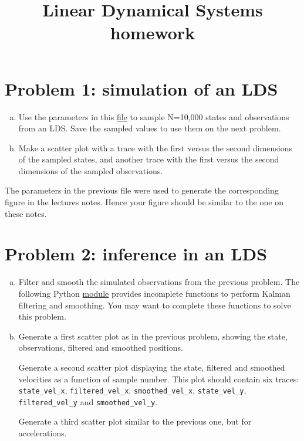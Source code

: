 \documentclass{article}
\title{Linear Dynamical Systems homework}
\author{}
\date{}
\begin{document}
\maketitle

\section*{Problem 1: simulation of an LDS}

\begin{enumerate}[(a)]

    \item Use the parameters in this
        \href{https://github.com/joacorapela/probabilisticModelingCourse/blob/master/lds/data/00000002_simulation_params.npz}{file}
        to sample N=10,000 states and observations from an LDS. Save the
        sampled values to use them on the next problem.

    \item Make a scatter plot with a trace with the first versus the second
        dimensions of the sampled states, and another trace with the first
        versus the second dimensions of the sampled observations.

\end{enumerate}

The parameters in the previous file were used to generate the corresponding
figure in the lectures notes. Hence your figure should be similar to the one on
these notes.

\section*{Problem 2: inference in an LDS}

\begin{enumerate}[(a)]

    \item Filter and smooth the simulated observations from the previous
        problem. The following Python
        \href{https://github.com/joacorapela/probabilisticModelingCourse/blob/master/lds/code/src/inference.py}{module}
        provides incomplete functions to perform Kalman filtering and
        smoothing. You may want to complete these functions to solve this
        problem.

    \item Generate a first scatter plot as in the previous problem, showing the
        state, observations, filtered and smoothed positions.

        Generate a second scatter plot displaying the state, filtered and
        smoothed velocities as a function of sample number. This plot should
        contain six traces: \texttt{state\_vel\_x}, \texttt{filtered\_vel\_x},
        \texttt{smoothed\_vel\_x}, \texttt{state\_vel\_y},
        \texttt{filtered\_vel\_y} and \texttt{smoothed\_vel\_y}.

        Generate a third scatter plot similar to the previous one, but for
        accelerations.

\end{enumerate}
\end{document}

